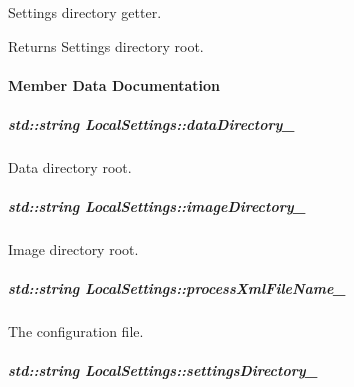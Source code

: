Settings directory getter. 

\begin{DoxyReturn}{Returns}
Settings directory root. 
\end{DoxyReturn}


\paragraph{Member Data Documentation}
\hypertarget{group___core_a7cddf57927891a603552ca37a8839f22}{
\subparagraph[{data\-Directory\-\_\-}]{\setlength{\rightskip}{0pt plus 5cm}std\-::string Local\-Settings\-::data\-Directory\-\_\-\hspace{0.3cm}{\ttfamily [private]}}}\label{group___core_a7cddf57927891a603552ca37a8839f22}


Data directory root. 

\hypertarget{group___core_aef55a56deb4853e3c7c2d17f87a65be7}{
\subparagraph[{image\-Directory\-\_\-}]{\setlength{\rightskip}{0pt plus 5cm}std\-::string Local\-Settings\-::image\-Directory\-\_\-\hspace{0.3cm}{\ttfamily [private]}}}\label{group___core_aef55a56deb4853e3c7c2d17f87a65be7}


Image directory root. 

\hypertarget{group___core_a19de001426c0ff8e8d4284202b929b08}{
\subparagraph[{process\-Xml\-File\-Name\-\_\-}]{\setlength{\rightskip}{0pt plus 5cm}std\-::string Local\-Settings\-::process\-Xml\-File\-Name\-\_\-\hspace{0.3cm}{\ttfamily [private]}}}\label{group___core_a19de001426c0ff8e8d4284202b929b08}


The configuration file. 

\hypertarget{group___core_af27f60deac73d6236070b4b78ed2fcbf}{
\subparagraph[{settings\-Directory\-\_\-}]{\setlength{\rightskip}{0pt plus 5cm}std\-::string Local\-Settings\-::settings\-Directory\-\_\-\hspace{0.3cm}{\ttfamily [private]}}}\label{group___core_af27f60deac73d6236070b4b78ed2fcbf}


